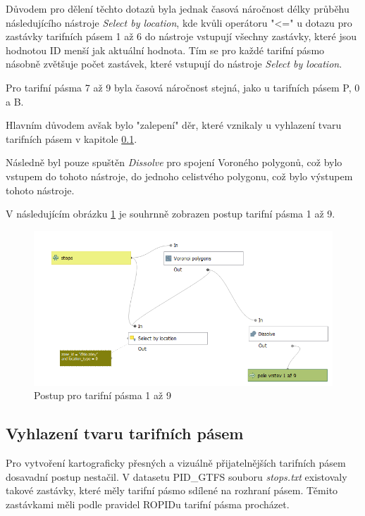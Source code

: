 Důvodem pro dělení těchto dotazů byla jednak časová náročnost délky průběhu následujícího nástroje \textit{Select by location}, 
kde kvůli operátoru "<=" u dotazu pro zastávky tarifních pásem 1 až 6 do nástroje vstupují všechny zastávky, 
které jsou hodnotou ID menší jak aktuální hodnota. Tím se pro každé tarifní pásmo násobně zvětšuje počet zastávek,
které vstupují do nástroje \textit{Select by location}.

Pro tarifní pásma 7 až 9 byla časová náročnost stejná, jako u tarifních pásem P, 0 a B.

Hlavním důvodem avšak bylo "zalepení" děr, které vznikaly u vyhlazení tvaru tarifních pásem v kapitole \ref{vyhlazeni}.  

Následně byl pouze spuštěn \textit{Dissolve} pro spojení Voroného polygonů, což bylo vstupem do tohoto nástroje,
do jednoho celistvého polygonu, což bylo výstupem tohoto nástroje.

V následujícím obrázku \ref{fig:postup-voronoi-1az9} je souhrnně zobrazen postup tarifní pásma 1 až 9.

\begin{figure}[H] \centering
    \includegraphics[width=400pt]{./pictures/postup-voronoi-1az9.png}
    \caption[Postup pro tarifní pásma 1 až 9]{Postup pro tarifní pásma 1 až 9}
	\label{fig:postup-voronoi-1az9}              
\end{figure}

\subsection{Vyhlazení tvaru tarifních pásem}
\label{vyhlazeni}

Pro vytvoření kartograficky přesných a vizuálně přijatelnějších tarifních pásem dosavadní postup nestačil.
V datasetu PID\_GTFS souboru \textit{stops.txt} existovaly takové zastávky, které měly tarifní pásmo sdílené
na rozhraní pásem. Těmito zastávkami měli podle pravidel ROPIDu tarifní pásma procházet.

